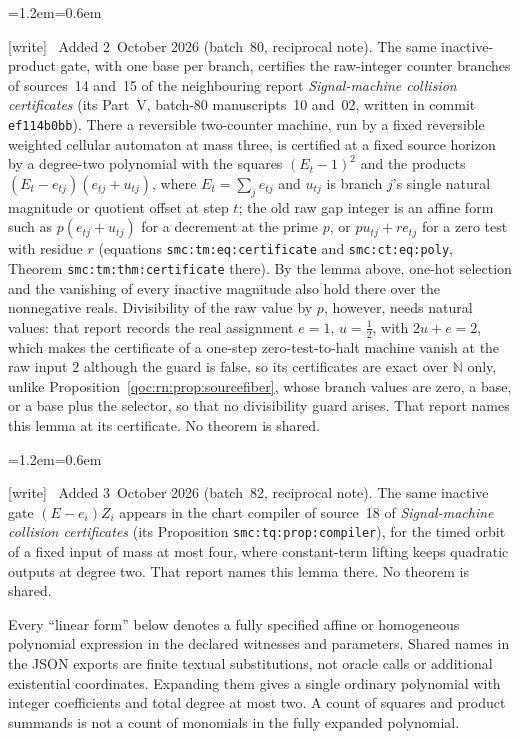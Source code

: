 \documentclass[11pt,letterpaper]{article}
\theoremstyle{definition}
\theoremstyle{remark}
\newcommand{\N}{\mathbb N}
\newcommand{\wtag}{\textup{[write]}}
\newenvironment{writenote}{\par\smallskip\begin{list}{}{\leftmargin=1.2em\rightmargin=0.6em}\item[]\small\wtag\ }{\end{list}\smallskip}
\newcommand{\lab}[1]{\nolinkurl{#1}}
\begin{document}
\begin{writenote}
Added 2~October 2026 (batch~80, reciprocal note). The same inactive-product gate, with one base per branch, certifies the raw-integer counter branches of sources~14 and~15 of the neighbouring report \emph{Signal-machine collision certificates} (its Part~V, batch-80 manuscripts~10 and~02, written in commit \texttt{ef114b0bb}). There a reversible two-counter machine, run by a fixed reversible weighted cellular automaton at mass three, is certified at a fixed source horizon by a degree-two polynomial with the squares $(E_t-1)^2$ and the products $(E_t-e_{tj})(e_{tj}+u_{tj})$, where $E_t=\sum_je_{tj}$ and $u_{tj}$ is branch $j$'s single natural magnitude or quotient offset at step $t$; the old raw gap integer is an affine form such as $p(e_{tj}+u_{tj})$ for a decrement at the prime $p$, or $pu_{tj}+re_{tj}$ for a zero test with residue $r$ (equations \lab{smc:tm:eq:certificate} and \lab{smc:ct:eq:poly}, Theorem \lab{smc:tm:thm:certificate} there). By the lemma above, one-hot selection and the vanishing of every inactive magnitude also hold there over the nonnegative reals. Divisibility of the raw value by $p$, however, needs natural values: that report records the real assignment $e=1$, $u=\tfrac12$, with $2u+e=2$, which makes the certificate of a one-step zero-test-to-halt machine vanish at the raw input $2$ although the guard is false, so its certificates are exact over $\N$ only, unlike Proposition~\ref{qoc:rn:prop:sourcefiber}, whose branch values are zero, a base, or a base plus the selector, so that no divisibility guard arises. That report names this lemma at its certificate. No theorem is shared.
\end{writenote}

\begin{writenote}
Added 3~October 2026 (batch~82, reciprocal note). The same inactive gate $(E-e_i)Z_i$ appears in the chart compiler of source~18 of \emph{Signal-machine collision certificates} (its Proposition \lab{smc:tq:prop:compiler}), for the timed orbit of a fixed input of mass at most four, where constant-term lifting keeps quadratic outputs at degree two. That report names this lemma there. No theorem is shared.
\end{writenote}


Every ``linear form'' below denotes a fully specified affine or homogeneous polynomial expression in the declared witnesses and parameters. Shared names in the JSON exports are finite textual substitutions, not oracle calls or additional existential coordinates. Expanding them gives a single ordinary polynomial with integer coefficients and total degree at most two. A count of squares and product summands is not a count of monomials in the fully expanded polynomial.
\end{document}
